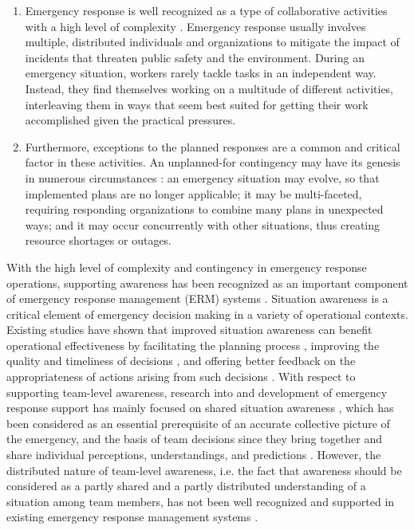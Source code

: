 \begin{enumerate}
	\item Emergency response is well recognized as a type of collaborative activities with a high level of complexity \cite{Turoff2004}. Emergency response usually involves multiple, distributed individuals and organizations to mitigate the impact of incidents that threaten public safety and the environment. During an emergency situation, workers rarely tackle tasks in an independent way. Instead, they find themselves working on a multitude of different activities, interleaving them in ways that seem best suited for getting their work accomplished given the practical pressures.
	\item Furthermore, exceptions to the planned responses are a common and critical factor in these activities. An unplanned-for contingency may have its genesis in numerous circumstances \cite{Mendonca2004}: an emergency situation may evolve, so that implemented plans are no longer applicable; it may be multi-faceted, requiring responding organizations to combine many plans in unexpected ways; and it may occur concurrently with other situations, thus creating resource shortages or outages.
\end{enumerate}

With the high level of complexity and contingency in emergency response operations, supporting awareness has been recognized as an important component of emergency response management (ERM) systems \cite{Turoff2004}. Situation awareness is a critical element of emergency decision making in a variety of operational contexts. Existing studies have shown that improved situation awareness can benefit operational effectiveness by facilitating the planning process \cite{Javed2011}, improving the quality and timeliness of decisions \cite{Blandford2004}, and offering better feedback on the appropriateness of actions arising from such decisions \cite{Chen2008}. With respect to supporting team-level awareness, research into and development of emergency response support has mainly focused on shared situation awareness \cite{Treurniet2012}, which has been considered as an essential prerequisite of an accurate collective picture of the emergency, and the basis of team decisions since they bring together and share individual perceptions, understandings, and predictions \cite{Javed2011}. However, the distributed nature of team-level awareness, i.e. the fact that awareness should be considered as a partly shared and a partly distributed understanding of a situation among team members, has not been well recognized and supported in existing emergency response management systems \cite{Treurniet2012}.

